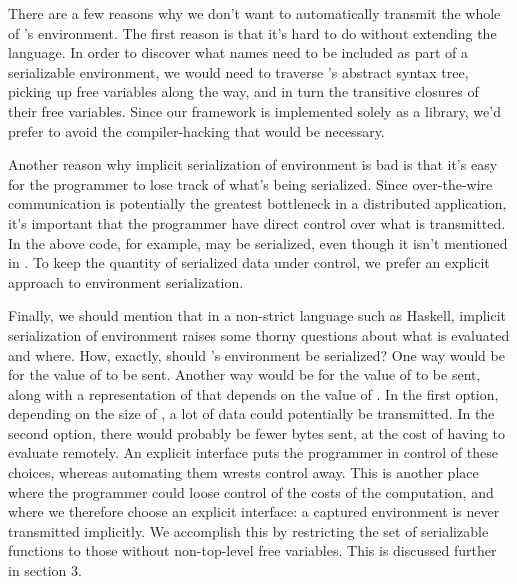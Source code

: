 \documentclass[preprint]{sigplanconf}
\newcommand\apb[1]{\nb{apb}{#1}}
\begin{document}
There are a few reasons why we don't want to automatically transmit the whole of 's environment. The first reason is that it's hard to do without extending the language. In order to discover what names need to be included as part of a serializable environment, we would need to traverse 's abstract syntax tree, picking up free variables along the way, and in turn the transitive closures of their free variables. Since our framework is implemented solely as a library, we'd prefer to avoid the compiler-hacking that would be necessary.
\apb{Isn't this a perfect job for Template Haskell?}

Another reason why implicit serialization of environment is bad is that it's easy for the programmer to lose track of what's being serialized. Since over-the-wire communication is potentially the greatest bottleneck in a distributed application, it's important that the programmer have direct control over what is transmitted. In the above code, for example,  may be serialized, even though it isn't mentioned in . To keep the quantity of serialized data under control, we prefer an explicit approach to environment serialization.

Finally, we should mention that in a non-strict language such as Haskell, implicit serialization of environment raises some thorny questions about what is evaluated and where. How, exactly, should 's environment be serialized? One way would be for the value of  to be sent. Another way would be for the value of  to be sent, along with a representation of  that depends on the value of . In the first option, depending on the size of , a lot of data could potentially be transmitted. In the second option, there would probably be fewer bytes sent, at the cost of having to evaluate  remotely. 
An explicit interface puts the programmer in control of these choices, whereas automating them wrests control away.
This is another place where the programmer could loose control of the costs of the computation, and where we therefore choose an explicit interface:
a captured environment is never transmitted implicitly. 
We accomplish this by restricting the set of serializable functions to those without non-top-level free variables. This is discussed further in section 3.
\end{document}
